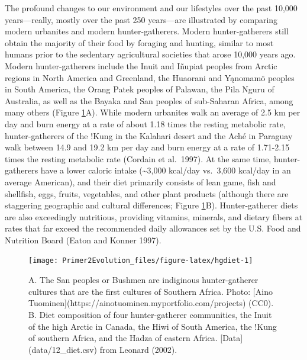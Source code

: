 \documentclass[
]{book}
\begin{document}
The profound changes to our environment and our lifestyles over the past 10,000 years---really, mostly over the past 250 years---are illustrated by comparing modern urbanites and modern hunter-gatherers. Modern hunter-gatherers still obtain the majority of their food by foraging and hunting, similar to most humans prior to the sedentary agricultural societies that arose 10,000 years ago. Modern hunter-gatherers include the Inuit and Iñupiat peoples from Arctic regions in North America and Greenland, the Huaorani and Yąnomamö peoples in South America, the Orang Patek peoples of Palawan, the Pila Nguru of Australia, as well as the Bayaka and San peoples of sub-Saharan Africa, among many others (Figure \ref{fig:hgdiet}A). While modern urbanites walk an average of 2.5 km per day and burn energy at a rate of about 1.18 times the resting metabolic rate, hunter-gatherers of the !Kung in the Kalahari desert and the Aché in Paraguay walk between 14.9 and 19.2 km per day and burn energy at a rate of 1.71-2.15 times the resting metabolic rate (Cordain et al.~1997). At the same time, hunter-gatherers have a lower caloric intake (\textasciitilde3,000 kcal/day vs.~3,600 kcal/day in an average American), and their diet primarily consists of lean game, fish and shellfish, eggs, fruits, vegetables, and other plant products (although there are staggering geographic and cultural differences; Figure \ref{fig:hgdiet}B). Hunter-gatherer diets are also exceedingly nutritious, providing vitamins, minerals, and dietary fibers at rates that far exceed the recommended daily allowances set by the U.S. Food and Nutrition Board (Eaton and Konner 1997).

\begin{figure}
\texttt{[image: Primer2Evolution\_files/figure-latex/hgdiet-1]} \caption{A. The San peoples or Bushmen are indiginous hunter-gatherer cultures that are the first cultures of Southern Africa. Photo: [Aino Tuominen](https://ainotuominen.myportfolio.com/projects) (CC0). B. Diet composition of four hunter-gatherer communities, the Inuit of the high Arctic in Canada, the Hiwi of South America, the !Kung of southern Africa, and the Hadza of eastern Africa. [Data](data/12_diet.csv) from Leonard (2002).}\label{fig:hgdiet}
\end{figure}
\end{document}
